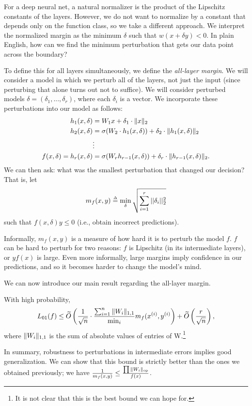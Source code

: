 For a deep neural net, a natural normalizer is the product of the Lipschitz constants of the layers. However, we do not want to normalize by a constant that depends only on the function class, so we take a different approach. We interpret the normalized margin as the minimum $\delta$ such that $w(x + \delta y) < 0$. In plain English, how can we find the minimum perturbation that gets our data point across the boundary?

To define this for all layers simultaneously, we define the \textit{all-layer margin}. We will consider a model in which we perturb all of the layers, not just the input (since perturbing that alone turns out not to suffice). We will consider perturbed models $\delta = (\delta_1, ..., \delta_r)$, where each $\delta_i$ is a vector. We incorporate these perturbations into our model as follows:
\begin{align}
    h_1(x, \delta) &= W_1 x + \delta_1 \cdot \|x\|_2 \\
    h_2(x, \delta) &= \sigma(W_2 \cdot h_1(x, \delta)) + \delta_2 \cdot \|h_1(x, \delta)\|_2 \\
    &\vdots \\
    f(x, \delta) = h_r(x, \delta) &= \sigma(W_r h_{r - 1}(x, \delta)) + \delta_r \cdot \|h_{r - 1}(x, \delta)\|_2.
\end{align}
We can then ask: what was the smallest perturbation that changed our decision? That is, let
\begin{align}
    m_f(x, y) \defeq \min_\delta \sqrt{\sum_{i=1}^r ||\delta_i||_2^2} 
\end{align}
such that $f(x, \delta)y \leq 0$ (i.e., obtain incorrect predictions).

Informally, $m_f(x, y)$ is a measure of how hard it is to perturb the model $f$. $f$ can be hard to perturb for two reasons: $f$ is Lipschitz (in its intermediate layers), or $yf(x)$ is large. Even more informally, large margins imply confidence in our predictions, and so it becomes harder to change the model's mind.

We can now introduce our main result regarding the all-layer margin.
\begin{theorem}
With high probability,
\begin{equation}
L_{01}(f) \leq \widetilde{O}\left (\frac{1}{\sqrt{n}} \cdot \frac{\sum_{i=1}^n \|W_i\|_{1, 1}}{\min_i} m_f(x^{(i)}, y^{(i)}\right ) + \widetilde{O}\left (\frac{r}{\sqrt{n}}\right ),
\end{equation}
where
$\|W_i\|_{1, 1}$ is the sum of absolute values of entries of W.\footnote{It is not clear that this is the best bound we can hope for.}
\end{theorem}
In summary, robustness to perturbations in intermediate errors implies good generalization. We can show that this bound is strictly better than the ones we obtained previously; we have $\frac{1}{m_f(x, y)} \leq \frac{\prod \|W_i\|_{\text{op}}}{f(x)}$.

